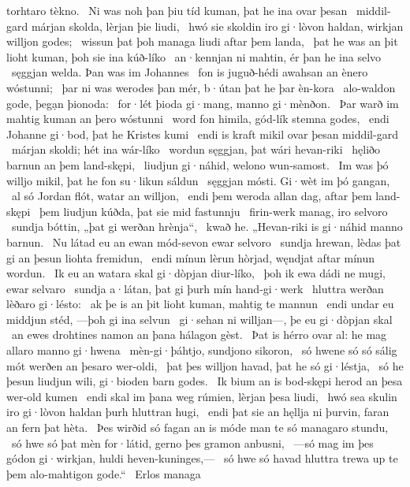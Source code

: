 torhtaro tèkno. \hld\ Ni was noh þan þiu tíd kuman,
þat he ina ovar þesan \hld\ middil-gard márjan skolda,
lèrjan þie liudi, \hld\ hwó sie skoldin iro gi·lòvon haldan,
wirkjan willjon godes; \hld\ wissun þat þoh managa
liudi aftar þem landa, \hld\ þat he was an þit lioht kuman,
þoh sie ina kúð-líko \hld\ an·kennjan ni mahtin,
ér þan he ina selvo \hld\ sęggjan welda.
Þan was im Johannes \hld\ fon is juguð-hédi
awahsan an ènero wóstunni; \hld\ þar ni was werodes þan mér,
b·útan þat he þar èn-kora \hld\ alo-waldon gode,
þegạn þionoda: \hld\ for·lét þioda gi·mang,
manno gi·mènðon. \hld\ Þar warð im mahtig kuman
an þero wóstunni \hld\ word fon himila,
gód-lík stemna godes, \hld\ endi Johanne gi·bod,
þat he Kristes kumi \hld\ endi is kraft mikil
ovar þesan middil-gard \hld\ márjan skoldi;
hét ina wár-líko \hld\ wordun sęggjan,
þat wári hevan-riki \hld\ hęliðo barnun
an þem land-skępi, \hld\ liudjun gi·náhid,
welono wun-samost. \hld\ Im was þó willjo mikil,
þat he fon su·likun sáldun \hld\ sęggjan mósti.
Gi·wèt im þó gangan, \hld\ al só Jordan flót,
watar an willjon, \hld\ endi þem weroda allan dag,
aftar þem land-skępi \hld\ þem liudjun kúðda,
þat sie mid fastunnju \hld\ firin-werk manag,
iro selvoro \hld\ sundja bóttin,
„þat gi werðan hrènja“, \hld\ kwað he. „Hevan-riki is
gi·náhid manno barnun. \hld\ Nu látad eu an ewan mód-sevon
ewar selvoro \hld\ sundja hrewan,
lèdas þat gi an þesun liohta fremidun, \hld\ endi mínun lèrun hòrjad,
węndjat aftar mínun wordun. \hld\ Ik eu an watara skal
gi·dòpjan diur-líko, \hld\ þoh ik ewa dádi ne mugi,
ewar selvaro \hld\ sundja a·látan,
þat gi þurh mín hand-gi·werk \hld\ hluttra werðan
lèðaro gi·lésto: \hld\ ak þe is an þit lioht kuman,
mahtig te mannun \hld\ endi undar eu middjun stéd,
—þoh gi ina selvun \hld\ gi·sehan ni willjan—,
þe eu gi·dòpjan skal \hld\ an ewes drohtines namon
an þana hálagon gèst. \hld\ Þat is hérro ovar al:
he mag allaro manno gi·hwena \hld\ mèn-gi·þáhtjo,
sundjono sikoron, \hld\ só hwene só só sálig mót
werðen an þesaro wer-oldi, \hld\ þat þes willjon havad,
þat he só gi·léstja, \hld\ só he þesun liudjun wili,
gi·bioden barn godes. \hld\ Ik bium an is bod-skępi herod
an þesa wer-old kumen \hld\ endi skal im þana weg rúmien,
lèrjan þesa liudi, \hld\ hwó sea skulin iro gi·lòvon haldan
þurh hluttran hugi, \hld\ endi þat sie an hęllja ni þurvin,
faran an fern þat hèta. \hld\ Þes wirðid só fagan an is móde
man te só managaro stundu, \hld\ só hwe só þat mèn for·látid,
gerno þes gramon anbusni, \hld\ —só mag im þes gódon gi·wirkjan,
huldi heven-kuninges,— \hld\ só hwe só havad hluttra trewa
up te þem alo-mahtigon gode.“ \hld\ Erlos managa
